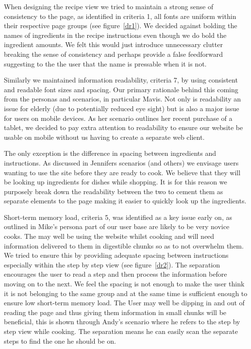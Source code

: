 When designing the recipe view we tried to maintain a strong sense of consistency to the page, as identified in criteria 1, all fonts are uniform within their respective page groups (see figure~\ref{dr1}). We decided against bolding the names of ingredients in the recipe instructions even though we do bold the ingredient amounts. We felt this would just introduce unnecessary clutter breaking the sense of consistency and perhaps provide a false feedforward suggesting to the the user that the name is pressable when it is not.

Similarly we maintained information readability, criteria 7, by using
consistent and readable font sizes and spacing. Our primary rationale
behind this coming from the personas and scenarios, in particular Mavis. Not only is readability an issue for elderly (due to potentially reduced eye sight) but is also a major issue for users on mobile devices. As her scenario outlines her recent purchase of a tablet, we decided to pay extra attention to readability to ensure our website be usable on mobile without us having to create a separate web client.

The only exception is the difference in spacing between ingredients and instructions. As discussed in Jennifers scenarios (and others) we envisage users wanting to use the site before they are ready to cook. We believe that they will be looking up ingredients for dishes while shopping. It is for this reason we purposely break down the readability between the two to cement them as separate elements to the page making it easier to quickly look up the ingredients.

Short-term memory load, criteria 5, was identified as a key issue early on, as outlined in Mike's persona part of our user base are likely to be very novice cooks. The may well be using the website whilst cooking and will need information delivered to them in digestible chunks so as to not overwhelm them. We tried to ensure this by providing adequate spacing between instructions especially within the step by step view (see figure~\ref{dr2}). The separation encourages the user to read a step and then process the information before moving on to the next. We feel the spacing is not enough to make the user think it is not belonging to the same group and at the same time is sufficient enough to ensure low short-term memory load. The User may well be dipping in and out of reading the page and thus giving them information in small chunks will be beneficial, this is shown through Andy's scenario where he refers to the step by step view while cooking. The separation means he can easily scan the separate steps to find the one he should be on.

